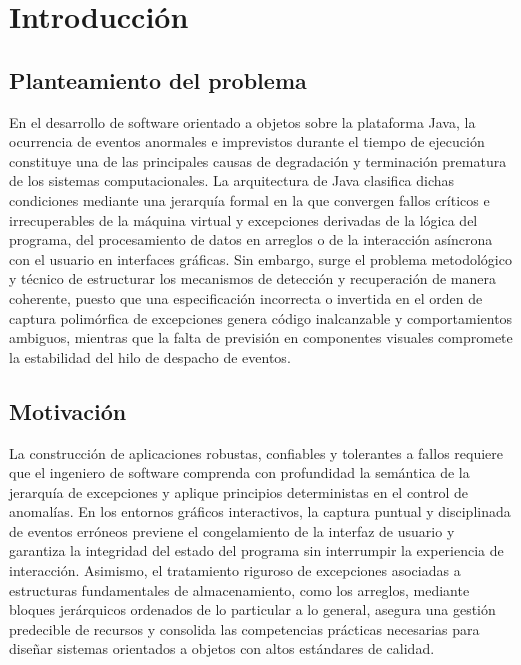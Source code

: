 \documentclass[letterpaper,12pt,oneside]{article}
\numberwithin{figure}{section}
\begin{document}
\ifdefined\PortadaPDF
  
\else
  \PackageError{reporte}{Falta definir PortadaPDF}{Inyecte la ruta privada de la portada convertida al compilar.}
\fi
\tableofcontents
\clearpage

\section{Introducción}

\subsection{Planteamiento del problema}
En el desarrollo de software orientado a objetos sobre la plataforma Java, la ocurrencia de eventos anormales e imprevistos durante el tiempo de ejecución constituye una de las principales causas de degradación y terminación prematura de los sistemas computacionales. La arquitectura de Java clasifica dichas condiciones mediante una jerarquía formal en la que convergen fallos críticos e irrecuperables de la máquina virtual y excepciones derivadas de la lógica del programa, del procesamiento de datos en arreglos o de la interacción asíncrona con el usuario en interfaces gráficas. Sin embargo, surge el problema metodológico y técnico de estructurar los mecanismos de detección y recuperación de manera coherente, puesto que una especificación incorrecta o invertida en el orden de captura polimórfica de excepciones genera código inalcanzable y comportamientos ambiguos, mientras que la falta de previsión en componentes visuales compromete la estabilidad del hilo de despacho de eventos.

\subsection{Motivación}
La construcción de aplicaciones robustas, confiables y tolerantes a fallos requiere que el ingeniero de software comprenda con profundidad la semántica de la jerarquía de excepciones y aplique principios deterministas en el control de anomalías. En los entornos gráficos interactivos, la captura puntual y disciplinada de eventos erróneos previene el congelamiento de la interfaz de usuario y garantiza la integridad del estado del programa sin interrumpir la experiencia de interacción. Asimismo, el tratamiento riguroso de excepciones asociadas a estructuras fundamentales de almacenamiento, como los arreglos, mediante bloques jerárquicos ordenados de lo particular a lo general, asegura una gestión predecible de recursos y consolida las competencias prácticas necesarias para diseñar sistemas orientados a objetos con altos estándares de calidad.
\end{document}
